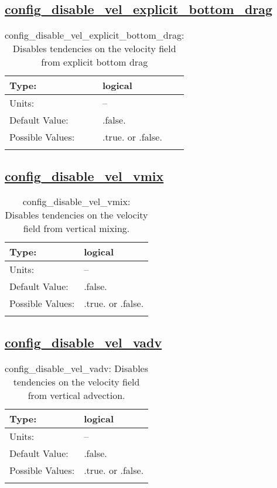 \subsection[config\_disable\_vel\_explicit\_bottom\_drag]{\hyperref[sec:nm_tab_debug]{config\_disable\_vel\_explicit\_bottom\_drag}}
\label{subsec:nm_sec_config_disable_vel_explicit_bottom_drag}
\begin{center}
\begin{longtable}{| p{2.0in} || p{4.0in} |}
    \hline
    Type: & logical \\
    \hline
    Units: & -- \\
    \hline
    Default Value: & .false. \\
    \hline
    Possible Values: & .true. or .false. \\
    \hline
    \caption{config\_disable\_vel\_explicit\_bottom\_drag: Disables tendencies on the velocity field from explicit bottom drag}
\end{longtable}
\end{center}
\subsection[config\_disable\_vel\_vmix]{\hyperref[sec:nm_tab_debug]{config\_disable\_vel\_vmix}}
\label{subsec:nm_sec_config_disable_vel_vmix}
\begin{center}
\begin{longtable}{| p{2.0in} || p{4.0in} |}
    \hline
    Type: & logical \\
    \hline
    Units: & -- \\
    \hline
    Default Value: & .false. \\
    \hline
    Possible Values: & .true. or .false. \\
    \hline
    \caption{config\_disable\_vel\_vmix: Disables tendencies on the velocity field from vertical mixing.}
\end{longtable}
\end{center}
\subsection[config\_disable\_vel\_vadv]{\hyperref[sec:nm_tab_debug]{config\_disable\_vel\_vadv}}
\label{subsec:nm_sec_config_disable_vel_vadv}
\begin{center}
\begin{longtable}{| p{2.0in} || p{4.0in} |}
    \hline
    Type: & logical \\
    \hline
    Units: & -- \\
    \hline
    Default Value: & .false. \\
    \hline
    Possible Values: & .true. or .false. \\
    \hline
    \caption{config\_disable\_vel\_vadv: Disables tendencies on the velocity field from vertical advection.}
\end{longtable}
\end{center}
